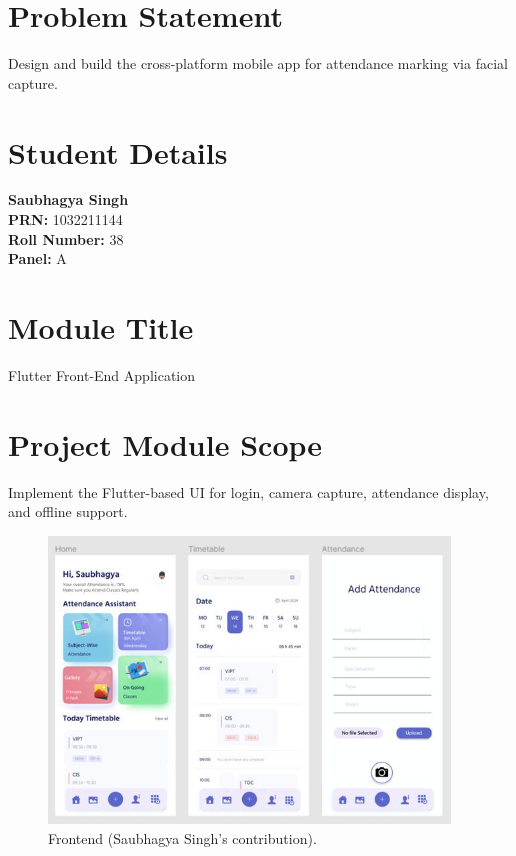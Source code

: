 \documentclass[openany]{report}
\begin{document}
\section{Problem Statement}
Design and build the cross-platform mobile app for attendance marking via facial capture.

\section{Student Details}
\textbf{Saubhagya Singh} \\
\textbf{PRN:} 1032211144 \\
\textbf{Roll Number:} 38 \\
\textbf{Panel:} A \\

\section{Module Title}
Flutter Front-End Application


\section{Project Module Scope}
Implement the Flutter-based UI for login, camera capture, attendance display, and offline support.
\begin{figure}[H]
    \centering
    \includegraphics[width=0.95\textwidth]{../imgs/frontend.jpg}
    \caption{Frontend  (Saubhagya Singh’s contribution).}
    \label{fig:block_diagram_saubhagya}
\end{figure}
\end{document}
